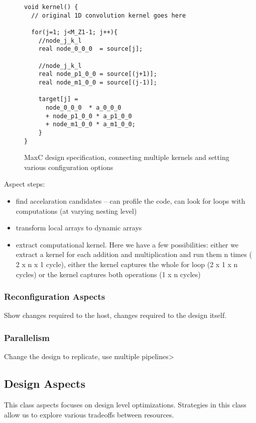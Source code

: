 \begin{figure}
\centering
\begin{lstlisting}
void kernel() {
  // original 1D convolution kernel goes here

  for(j=1; j<M_Z1-1; j++){
    //node_j_k_l
    real node_0_0_0  = source[j];

    //node_j_k_l
    real node_p1_0_0 = source[(j+1)];
    real node_m1_0_0 = source[(j-1)];

    target[j] =
      node_0_0_0  * a_0_0_0
      + node_p1_0_0 * a_p1_0_0
      + node_m1_0_0 * a_m1_0_0;
    }
}
\end{lstlisting}
\caption{MaxC design specification, connecting multiple
    kernels and setting various configuration options}
\label{fig:maxc-design}
\end{figure}

Aspect steps:
\begin{itemize}
\item find accelaration candidates -- can profile the code, can look
  for loops with computations (at varying nesting level)

\item transform local arrays to dynamic arrays

\item extract computational kernel. Here we have a few
  possibilities: either we extract a kernel for each addition and
  multiplication and run them n times ( 2 x n x 1 cycle), either the
  kernel captures the whole for loop (2 x 1 x n cycles) or the kernel
  captures both operations (1 x n cycles)
\end{itemize}

\subsubsection{Reconfiguration Aspects}

Show changes required to the host, changes required to the design itself.

\subsubsection{Parallelism}

Change the design to replicate, use multiple pipelines>

\subsection{Design Aspects}
This class aspects focuses on design level optimizations. Strategies
in this class allow us to explore various tradeoffs between resources.

